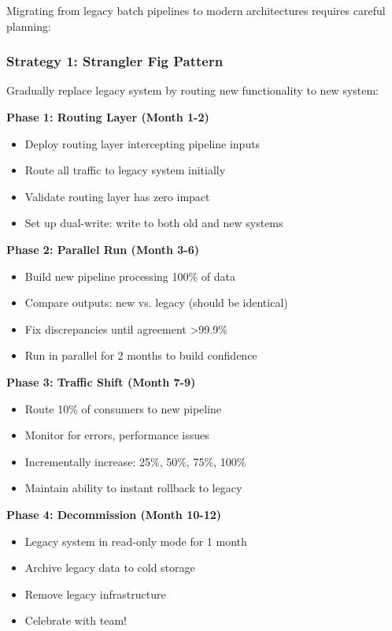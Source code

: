 Migrating from legacy batch pipelines to modern architectures requires careful planning:

\subsubsection{Strategy 1: Strangler Fig Pattern}

Gradually replace legacy system by routing new functionality to new system:

\textbf{Phase 1: Routing Layer (Month 1-2)}
\begin{itemize}
    \item Deploy routing layer intercepting pipeline inputs
    \item Route all traffic to legacy system initially
    \item Validate routing layer has zero impact
    \item Set up dual-write: write to both old and new systems
\end{itemize}

\textbf{Phase 2: Parallel Run (Month 3-6)}
\begin{itemize}
    \item Build new pipeline processing 100\% of data
    \item Compare outputs: new vs. legacy (should be identical)
    \item Fix discrepancies until agreement >99.9\%
    \item Run in parallel for 2 months to build confidence
\end{itemize}

\textbf{Phase 3: Traffic Shift (Month 7-9)}
\begin{itemize}
    \item Route 10\% of consumers to new pipeline
    \item Monitor for errors, performance issues
    \item Incrementally increase: 25\%, 50\%, 75\%, 100\%
    \item Maintain ability to instant rollback to legacy
\end{itemize}

\textbf{Phase 4: Decommission (Month 10-12)}
\begin{itemize}
    \item Legacy system in read-only mode for 1 month
    \item Archive legacy data to cold storage
    \item Remove legacy infrastructure
    \item Celebrate with team!
\end{itemize}

